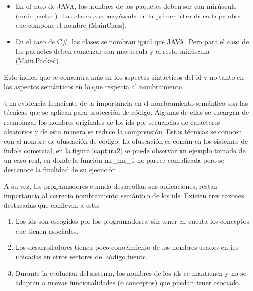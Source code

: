 \documentclass[a4paper,12pt]{report}
\begin{document}
\begin{itemize}
\itemsep0em%
\item En el caso de JAVA, los nombres de los paquetes deben ser con minúscula (main.packed). Las clases con mayúscula en la primer letra de cada palabra que compone el nombre (MainClass).

\item En el caso de C\#, las clases se nombran igual que JAVA. Pero para el caso de los paquetes deben comenzar con mayúscula y el resto minúscula (Main.Packed).
\end{itemize}

Esto indica que se concentra más en los aspectos sintácticos del id y no tanto en los aspectos semánticos en lo que respecta al nombramiento. 






Una evidencia fehaciente de la importancia en el nombramiento semántico son las técnicas que se aplican para protección de código. Algunas de ellas se encargan de reemplazar los nombres originales de los ids por secuencias de caracteres aleatorios y de esta manera se reduce la comprensión. Estas técnicas se conocen con el nombre de ofuscación de código. La ofuscación es común en los sistemas de índole comercial, en la figura \ref{captura2} se puede observar un ejemplo tomado de un caso real, en donde la función \textsf{mr\_mr\_1} no parece complicada pero se desconoce la finalidad de su ejecución \cite{DFPM05}.

A su vez, los programadores cuando desarrollan sus aplicaciones, restan importancia al correcto nombramiento semántico de los ids. Existen tres razones destacadas que conllevan a esto:

\begin{enumerate}
\itemsep0em%
\item Los ids son escogidos por los programadores, sin tener en cuenta los conceptos que tienen asociados.

\item Los desarrolladores tienen poco conocimiento de los nombres usados en  ids ubicados en otros sectores del código fuente.

\item Durante la evolución del sistema, los nombres de los ids se mantienen y no se adaptan a nuevas funcionalidades (o conceptos) que puedan tener asociado.
\end{enumerate}
\end{document}
